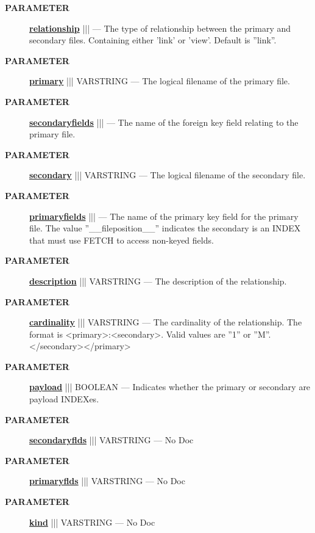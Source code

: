 \par
\begin{description}
\item [\colorbox{tagtype}{\color{white} \textbf{\textsf{PARAMETER}}}] \textbf{\underline{relationship}} |||  --- The type of relationship between the primary and secondary files. Containing either 'link' or 'view'. Default is ''link''.
\item [\colorbox{tagtype}{\color{white} \textbf{\textsf{PARAMETER}}}] \textbf{\underline{primary}} ||| VARSTRING --- The logical filename of the primary file.
\item [\colorbox{tagtype}{\color{white} \textbf{\textsf{PARAMETER}}}] \textbf{\underline{secondaryfields}} |||  --- The name of the foreign key field relating to the primary file.
\item [\colorbox{tagtype}{\color{white} \textbf{\textsf{PARAMETER}}}] \textbf{\underline{secondary}} ||| VARSTRING --- The logical filename of the secondary file.
\item [\colorbox{tagtype}{\color{white} \textbf{\textsf{PARAMETER}}}] \textbf{\underline{primaryfields}} |||  --- The name of the primary key field for the primary file. The value ''\_\_fileposition\_\_'' indicates the secondary is an INDEX that must use FETCH to access non-keyed fields.
\item [\colorbox{tagtype}{\color{white} \textbf{\textsf{PARAMETER}}}] \textbf{\underline{description}} ||| VARSTRING --- The description of the relationship.
\item [\colorbox{tagtype}{\color{white} \textbf{\textsf{PARAMETER}}}] \textbf{\underline{cardinality}} ||| VARSTRING --- The cardinality of the relationship. The format is <primary>:<secondary>. Valid values are ''1'' or ''M''.</secondary></primary>
\item [\colorbox{tagtype}{\color{white} \textbf{\textsf{PARAMETER}}}] \textbf{\underline{payload}} ||| BOOLEAN --- Indicates whether the primary or secondary are payload INDEXes.
\item [\colorbox{tagtype}{\color{white} \textbf{\textsf{PARAMETER}}}] \textbf{\underline{secondaryflds}} ||| VARSTRING --- No Doc
\item [\colorbox{tagtype}{\color{white} \textbf{\textsf{PARAMETER}}}] \textbf{\underline{primaryflds}} ||| VARSTRING --- No Doc
\item [\colorbox{tagtype}{\color{white} \textbf{\textsf{PARAMETER}}}] \textbf{\underline{kind}} ||| VARSTRING --- No Doc
\end{description}







